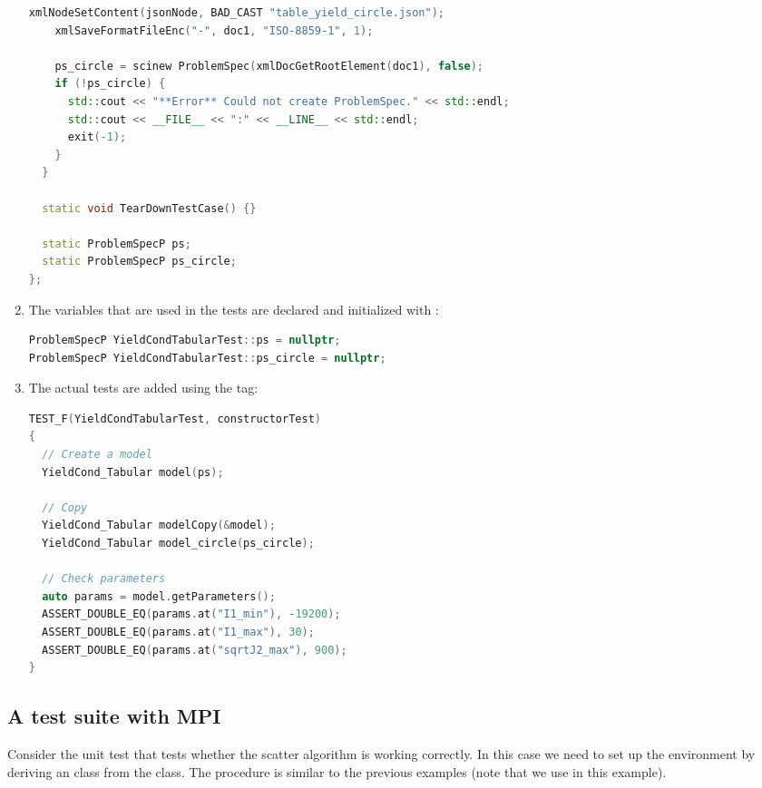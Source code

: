 \begin{enumerate}
\begin{lstlisting}[language=Cpp]
    xmlNodeSetContent(jsonNode, BAD_CAST "table_yield_circle.json");
    xmlSaveFormatFileEnc("-", doc1, "ISO-8859-1", 1);

    ps_circle = scinew ProblemSpec(xmlDocGetRootElement(doc1), false);
    if (!ps_circle) {
      std::cout << "**Error** Could not create ProblemSpec." << std::endl;
      std::cout << __FILE__ << ":" << __LINE__ << std::endl;
      exit(-1);
    }
  }

  static void TearDownTestCase() {}

  static ProblemSpecP ps;
  static ProblemSpecP ps_circle;
};
\end{lstlisting}

  \item The variables that are used in the tests are declared  and
        initialized with :
\begin{lstlisting}[language=Cpp]
ProblemSpecP YieldCondTabularTest::ps = nullptr;
ProblemSpecP YieldCondTabularTest::ps_circle = nullptr;
\end{lstlisting}

  \item The actual tests are added using the  tag:
\begin{lstlisting}[language=Cpp]
TEST_F(YieldCondTabularTest, constructorTest)
{
  // Create a model
  YieldCond_Tabular model(ps);

  // Copy
  YieldCond_Tabular modelCopy(&model);
  YieldCond_Tabular model_circle(ps_circle);

  // Check parameters
  auto params = model.getParameters();
  ASSERT_DOUBLE_EQ(params.at("I1_min"), -19200);
  ASSERT_DOUBLE_EQ(params.at("I1_max"), 30);
  ASSERT_DOUBLE_EQ(params.at("sqrtJ2_max"), 900);
}
\end{lstlisting}
\end{enumerate}

\subsection{A test suite with MPI}
Consider the unit test  that tests whether the
scatter algorithm is working correctly.  In this case we need to set up the 
environment by deriving an class from the  class.
The procedure is similar to the previous examples (note that we use 
in this example).

